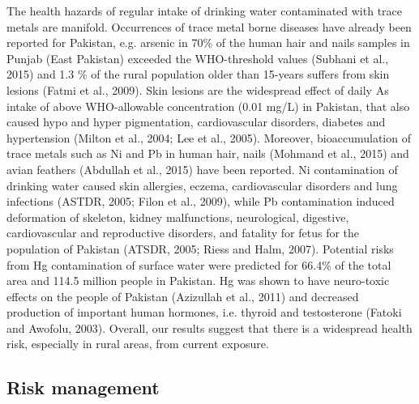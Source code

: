 The health hazards of regular intake of drinking water contaminated with trace metals are manifold. Occurrences of trace metal borne diseases have already been reported for Pakistan, e.g. arsenic in 70\% of the human hair and nails samples in Punjab (East Pakistan) exceeded the WHO-threshold values (Subhani et al., 2015) and 1.3 \% of the rural population older than 15-years suffers from skin lesions (Fatmi et al., 2009). Skin lesions are the widespread effect of  daily As intake of above WHO-allowable concentration (0.01 mg/L) in Pakistan, that also caused hypo and hyper pigmentation, cardiovascular disorders, diabetes and hypertension (Milton et al., 2004; Lee et al., 2005). Moreover, bioaccumulation of trace metals such as Ni and Pb in human hair, nails (Mohmand et al., 2015) and avian feathers (Abdullah et al., 2015) have been reported. Ni contamination of drinking water caused skin allergies, eczema, cardiovascular disorders and lung infections (ASTDR, 2005; Filon et al., 2009), while Pb contamination induced deformation of skeleton, kidney malfunctions, neurological, digestive, cardiovascular and reproductive disorders, and fatality for fetus for the population of Pakistan (ATSDR, 2005; Riess and Halm, 2007). Potential risks from Hg contamination of surface water were predicted for 66.4\% of the total area and 114.5 million people in Pakistan. Hg was shown to have  neuro-toxic effects on the people of Pakistan  (Azizullah et al., 2011) and decreased production of important human hormones, i.e. thyroid and testosterone (Fatoki and Awofolu, 2003).    Overall, our results suggest that there is a widespread health risk, especially in rural areas, from current exposure.

\subsection{Risk management}
\label{Risk management}


